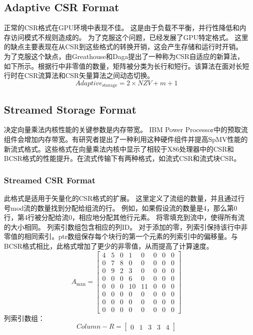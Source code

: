 \documentclass[forprint]{WHUBachelor}
\begin{document}
\subsection{Adaptive CSR Format}
正常的CSR格式在GPU环境中表现不佳。 这是由于负载不平衡，并行性降低和内存访问模式不规则造成的。 为了克服这个问题，已经发展了GPU特定格式。 这里的缺点主要表现在从CSR到这些格式的转换开销，这会产生存储和运行时开销。 为了克服这个缺点，由Greathouse和Daga提出了一种称为CSR自适应的新算法\cite{Greathouse2014Efficient}，如下所示。根据行中非零值的数量，矩阵被分类为长行和短行。该算法在面对长短行时在CSR流算法和CSR矢量算法之间动态切换。
\begin{equation} 
Adaptive_{\text {storage}}=2 \times N Z V+m+1
 \end{equation}
\subsection{Streamed Storage Format}
决定向量乘法内核性能的关键参数是内存带宽。 IBM Power Processor中的预取流组件会增加内存带宽。有研究者提出了一种利用这种硬件组件并提高SpMV性能的新流式格式\cite{Guo2012Adaptive}。这些格式在向量乘法内核中显示了相较于X86处理器中的CSR和BCSR格式的性能提升。在流式传输下有两种格式，如流式CSR和流式块CSR。
\subsubsection{Streamed CSR Format}
此格式是适用于矢量化的CSR格式的扩展。 这里定义了流组的数量，并且通过行号mod流的数量找到分配给组流的行。 例如，如果假设流的数量是4，那么第0行，第4行被分配给流0，相应地分配其他行元素。 将零填充到流中，使得所有流的大小相同。 列索引数组包含相应的列ID。 对于添加的零，列索引保持该行中非零值的相同索引。ptr数组保存每个块行的第一个元素的列索引中的偏移量。与BCSR格式相比，此格式增加了更少的非零值，从而提高了计算速度。
\begin{equation} 
A_{\operatorname{mxn}}=\left[ \begin{array}{cccccccc}{4} & {5} & {0} & {1} & {0} & {0} & {0} & {0} \\ {0} & {7} & {8} & {0} & {0} & {0} & {0} & {0} \\ {0} & {9} & {2} & {3} & {0} & {0} & {0} & {0} \\ {0} & {0} & {0} & {6} & {0} & {0} & {0} & {0} \\ {0} & {0} & {0} & {10} & {11} & {0} & {0} & {0} \\ {0} & {0} & {0} & {0} & {0} & {0} & {0} & {0} \\ {0} & {0} & {0} & {0} & {0} & {0} & {0} & {0} \\ {0} & {0} & {0} & {0} & {0} & {0} & {0} & {0}\end{array}\right]
 \end{equation}
列索引数组：
\begin{equation} 
Column-R=\left[ \begin{array}{lllll}{0} & {1} & {3} & {3} & {4}\end{array}\right]
 \end{equation}
\end{document}
